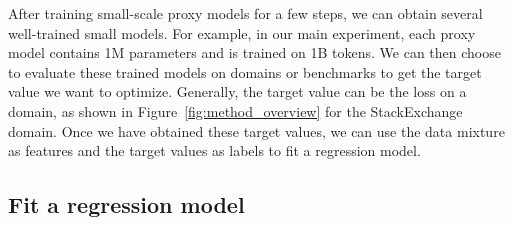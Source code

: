 After training small-scale proxy models for a few steps, we can obtain several well-trained small models. For example, in our main experiment, each proxy model contains 1M parameters and is trained on 1B tokens. We can then choose to evaluate these trained models on domains or benchmarks to get the target value we want to optimize.
Generally, the target value can be the loss on a domain, as shown in Figure~\ref{fig:method_overview} for the StackExchange domain.
Once we have obtained these target values, we can use the data mixture as features and the target values as labels to fit a regression model.

\subsection{Fit a regression model}

